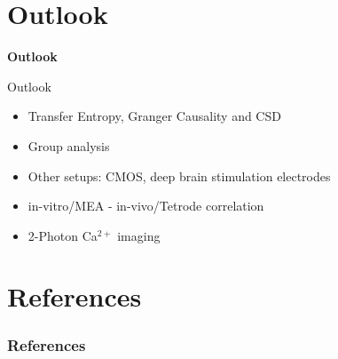 \documentclass[10pt]{beamer}
\begin{document}
\section{Outlook}
\begin{frame}
\begin{center}
 \begin{Huge}
  \textbf{Outlook}
 \end{Huge}
 \end{center}
\end{frame}

\begin{frame}{Outlook}
\begin{itemize}
 \item Transfer Entropy, Granger Causality and CSD \\ [1em]
 \item Group analysis \\ [1em]
 \item Other setups: CMOS, deep brain stimulation electrodes \\ [1em]
 \item in-vitro/MEA - in-vivo/Tetrode correlation \\ [1em]
 \item 2-Photon Ca$^{2+}$ imaging \\ [1em]
\end{itemize}
\end{frame}
     
     
\section{References}
    \begin{frame}[allowframebreaks]
      \frametitle{References}
      \begin{tiny}
      \nocite{*}
      \printbibliography
      \end{tiny}
    \end{frame}

 
\end{document}

